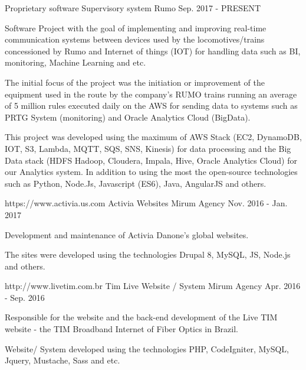 \begin{cventries}
{    }
  \cventry
    {Proprietary software} %
    {Supervisory system}%
    {Rumo} %
    {Sep. 2017 - PRESENT} %
    {
      \begin{cvitems} %
       \item{Software Project with the goal of implementing and improving real-time communication systems between devices used by the locomotives/trains concessioned by Rumo and Internet of things (IOT) for handling data such as BI, monitoring, Machine Learning and etc.}
       \item{The initial focus of the project was the initiation or improvement of the equipment used in the route by the company's RUMO trains running an average of 5 million rules executed daily on the AWS for sending data to systems such as PRTG System (monitoring) and Oracle Analytics Cloud (BigData).}
       \item{This project was developed using the maximum of AWS Stack (EC2, DynamoDB, IOT, S3, Lambda, MQTT, SQS, SNS, Kinesis) for data processing and the Big Data stack (HDFS Hadoop, Cloudera, Impala, Hive, Oracle Analytics Cloud) for our Analytics system. In addition to using the most the open-source technologies such as Python, Node.Js, Javascript (ES6), Java, AngularJS and others.}
      \end{cvitems}
    }

  \cventry
    {https://www.activia.us.com} %
    {Activia Websites} %
    {Mirum Agency} %
    {Nov. 2016 - Jan. 2017} %
    {
      \begin{cvitems} %
        \item {Development and maintenance of Activia Danone's global websites.}
        \item {The sites were developed using the technologies Drupal 8, MySQL, JS, Node.js and others.}
      \end{cvitems}
    }


  \cventry
    {http://www.livetim.com.br} %
    {Tim Live Website / System} %
    {Mirum Agency} %
    {Apr. 2016 - Sep. 2016} %
    {
      \begin{cvitems} %
        \item {Responsible for the website and the back-end development of the Live TIM website - the TIM Broadband Internet of Fiber Optics in Brazil.}
        \item {Website/ System developed using the technologies PHP, CodeIgniter, MySQL, Jquery, Mustache, Sass and etc.}
      \end{cvitems}
    }


\end{cventries}
